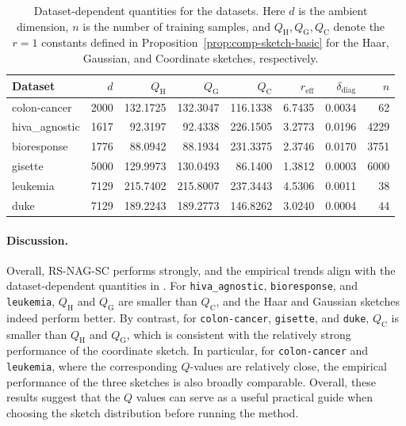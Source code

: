 \documentclass[10pt]{article}
\begin{document}
\begin{table}[t]
\centering
\caption{
Dataset-dependent quantities for the datasets.
Here $d$ is the ambient dimension, $n$ is the number of training samples, and
$Q_{\mathrm H}, Q_{\mathrm G}, Q_{\mathrm C}$ denote the $r=1$ constants defined in Proposition~\ref{prop:comp-sketch-basic} for the Haar, Gaussian, and Coordinate sketches, respectively.
}
\label{tab:logreg-q-values-additional}
\small
\setlength{\tabcolsep}{4.5pt}
\renewcommand{\arraystretch}{1.1}
\begin{tabular}{@{}lrrrrrrr@{}}
\toprule
Dataset & $d$ & $Q_{\mathrm H}$ & $Q_{\mathrm G}$ & $Q_{\mathrm C}$ & $r_{\mathrm{eff}}$ & $\delta_{\mathrm{diag}}$ & $n$ \\
\midrule
colon-cancer   & 2000 & 132.1725 & 132.3047 & 116.1338 & 6.7435 & 0.0034 & 62 \\
hiva\_agnostic & 1617 &  92.3197 &  92.4338 & 226.1505 & 3.2773 & 0.0196 & 4229 \\
bioresponse    & 1776 &  88.0942 &  88.1934 & 231.3375 & 2.3746 & 0.0170 & 3751 \\
gisette        & 5000 & 129.9973 & 130.0493 &  86.1400 & 1.3812 & 0.0003 & 6000 \\
leukemia       & 7129 & 215.7402 & 215.8007 & 237.3443 & 4.5306 & 0.0011 & 38 \\
duke           & 7129 & 189.2243 & 189.2773 & 146.8262 & 3.0240 & 0.0004 & 44 \\
\bottomrule
\end{tabular}
\end{table}

\paragraph{Discussion.}
Overall, RS-NAG-SC performs strongly, and the empirical trends align with the
dataset-dependent quantities in .
For \texttt{hiva\_agnostic}, \texttt{bioresponse}, and \texttt{leukemia}, \(Q_{\mathrm H}\) and \(Q_{\mathrm G}\) are smaller than \(Q_{\mathrm C}\), and the Haar and Gaussian sketches indeed perform better.
By contrast, for \texttt{colon-cancer}, \texttt{gisette}, and \texttt{duke}, \(Q_{\mathrm C}\) is smaller than \(Q_{\mathrm H}\) and \(Q_{\mathrm G}\), which is consistent with the relatively strong performance of the coordinate sketch.
In particular, for \texttt{colon-cancer} and \texttt{leukemia}, where the corresponding \(Q\)-values are relatively close, the empirical performance of the three sketches is also broadly comparable.
Overall, these results suggest that the $Q$ values can serve as a useful practical guide when choosing the sketch distribution before running the method.
\end{document}
